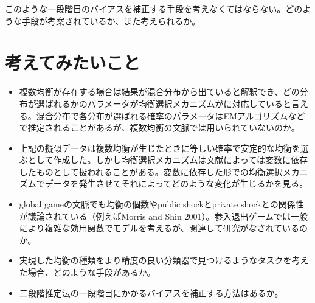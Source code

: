\documentclass{jsarticle}
\begin{document}
このような一段階目のバイアスを補正する手段を考えなくてはならない。どのような手段が考案されているか、また考えられるか。

\section{考えてみたいこと}
\begin{itemize}
	\item 複数均衡が存在する場合は結果が混合分布から出ていると解釈でき、どの分布が選ばれるかのパラメータが均衡選択メカニズムがに対応していると言える。混合分布で各分布が選ばれる確率のパラメータはEMアルゴリズムなどで推定されることがあるが、複数均衡の文脈では用いられていないのか。
	\item 上記の擬似データは複数均衡が生じたときに等しい確率で安定的な均衡を選ぶとして作成した。しかし均衡選択メカニズムは文献によっては変数に依存したものとして扱われることがある。変数に依存した形での均衡選択メカニズムでデータを発生させてそれによってどのような変化が生じるかを見る。
	\item global gameの文脈でも均衡の個数やpublic shockとprivate shockとの関係性が議論されている（例えばMorris and Shin 2001）。参入退出ゲームでは一般により複雑な効用関数でモデルを考えるが、関連して研究がなされているのか。
	\item 実現した均衡の種類をより精度の良い分類器で見つけるようなタスクを考えた場合、どのような手段があるか。
	\item 二段階推定法の一段階目にかかるバイアスを補正する方法はあるか。
\end{itemize}
\end{document}
